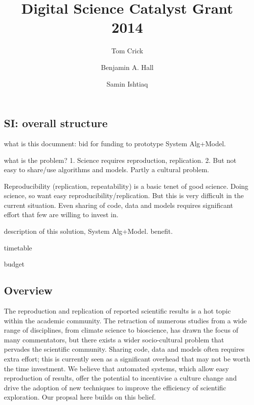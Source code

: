 \documentclass[a4paper,11pt]{article}
\title{\vspace{-4em}Digital Science Catalyst Grant 2014}
\author[1]{Tom Crick}
\author[2]{Benjamin A. Hall}
\author[3]{Samin Ishtiaq}
\affil[1]{Department of Computing \& Information Systems, Cardiff Metropolitan University}
\affil[2]{MRC Cancer Unit, University of Cambridge}
\affil[3]{Microsoft Research Cambridge}
\affil[1]{\protect\url{tcrick@cardiffmet.ac.uk}}
\date{ }
\begin{document}
\maketitle





\subsection{SI: overall structure}

what is this documnent: bid for funding to prototype System Alg+Model. 

what is the problem?
1. Science requires reproduction, replication. 
2. But not easy to share/use algorithms and models. Partly a cultural problem. 

Reproducibility (replication, repeatability) is a basic tenet of good science. 
Doing science, so want easy reproducibility/replication. 
But this is very difficult in the current situation. Even sharing of
code, data and models requires significant effort that few are willing
to invest in.


description of this solution, System Alg+Model. 
benefit. 

timetable

budget



\subsection*{Overview}

The reproduction and replication of reported scientific results is a
hot topic within the academic community. The retraction of numerous
studies from a wide range of disciplines, from climate science to
bioscience, has drawn the focus of many commentators, but there exists
a wider socio-cultural problem that pervades the scientific community.
Sharing code, data and models often requires extra effort; this is
currently seen as a significant overhead that may not be worth the
time investment.
%
We believe that automated systems, which allow easy reproduction of results, offer the
potential to incentivise a culture change and drive the adoption of
new techniques to improve the efficiency of scientific exploration. 
Our propsal here builds on this belief. 
\end{document}
